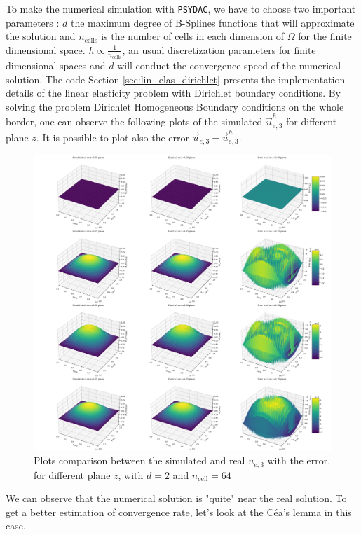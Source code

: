 \documentclass[a4paper,12pt,twoside]{report}
\begin{document}
To make the numerical simulation with \texttt{PSYDAC}, we have to choose two important parameters : $d$ the maximum degree of B-Splines functions that will approximate the solution and $n_{\text{cells}}$ is the number of cells in each dimension of $\Omega$ for the finite dimensional space. $\displaystyle h \propto \frac{1}{n_{\text{cells}}}$, an usual discretization parameters for finite dimensional spaces and $d$ will conduct the convergence speed of the numerical solution. 
The code Section \ref{sec:lin_elas_dirichlet} presents the implementation details of the linear elasticity problem with Dirichlet boundary conditions.
By solving the problem Dirichlet Homogeneous Boundary conditions on the whole border, one can observe the following plots of the simulated $\vec u_{e,3}^h$ for different plane $z$. It is possible to plot also the error $\vec u_{e,3} - \vec u_{e,3}^h$.
\begin{figure}[!h]
    \centering
    \includegraphics[width=0.8\linewidth]{figures/3d_plots_degree_2_non_mixed_dirichlet_homogeneous_ncell=64.png}
    \caption{Plots comparison between the simulated and real $u_{e,3}$ with the error, for different plane $z$, with $d=2$ and $n_{\text{cell}} = 64$}
    \label{fig:3D_plots}
\end{figure}

We can observe that the numerical solution is "quite" near the real solution. To get a better estimation of convergence rate, let's look at the Céa's lemma in this case.
\end{document}
